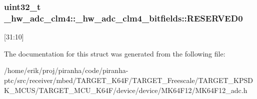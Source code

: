 \subsubsection[{\texorpdfstring{R\+E\+S\+E\+R\+V\+E\+D0}{RESERVED0}}]{\setlength{\rightskip}{0pt plus 5cm}uint32\+\_\+t \+\_\+hw\+\_\+adc\+\_\+clm4\+::\+\_\+hw\+\_\+adc\+\_\+clm4\+\_\+bitfields\+::\+R\+E\+S\+E\+R\+V\+E\+D0}\hypertarget{struct__hw__adc__clm4_1_1__hw__adc__clm4__bitfields_a5b778a00ea759b45b209fbfedd479f22}{}\label{struct__hw__adc__clm4_1_1__hw__adc__clm4__bitfields_a5b778a00ea759b45b209fbfedd479f22}
\mbox{[}31\+:10\mbox{]} 

The documentation for this struct was generated from the following file\+:\begin{DoxyCompactItemize}
\item 
/home/erik/proj/piranha/code/piranha-\/ptc/src/receiver/mbed/\+T\+A\+R\+G\+E\+T\+\_\+\+K64\+F/\+T\+A\+R\+G\+E\+T\+\_\+\+Freescale/\+T\+A\+R\+G\+E\+T\+\_\+\+K\+P\+S\+D\+K\+\_\+\+M\+C\+U\+S/\+T\+A\+R\+G\+E\+T\+\_\+\+M\+C\+U\+\_\+\+K64\+F/device/device/\+M\+K64\+F12/M\+K64\+F12\+\_\+adc.\+h\end{DoxyCompactItemize}
